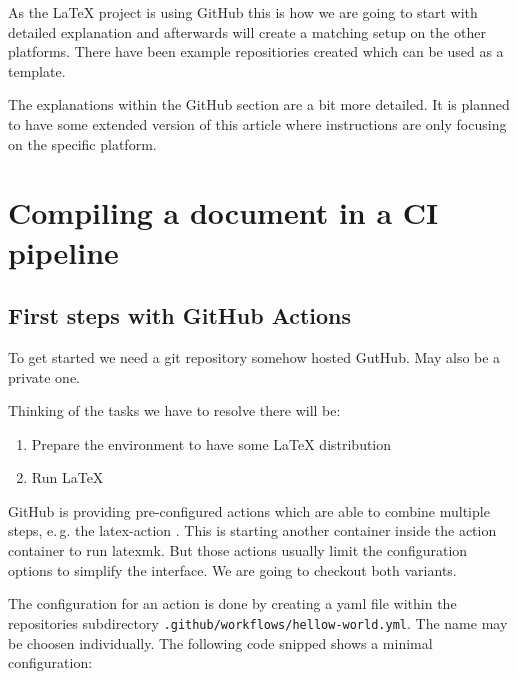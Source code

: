 \documentclass[final]{ltugboat}
\newcommand*{\file}[1]{\texttt{#1}}
\begin{document}
As the \LaTeX{} project is using GitHub this is how we are going to start with detailed explanation and afterwards will create a matching setup on the other platforms.
There have been example repositiories created which can be used as a template.

The explanations within the GitHub section are a bit more detailed.
It is planned to have some extended version of this article where instructions are only focusing on the specific platform.

\section{Compiling a document in a CI pipeline}

\subsection{First steps with GitHub Actions}

To get started we need a git repository somehow hosted GutHub.
May also be a private one.

Thinking of the tasks we have to resolve there will be:

\begin{enumerate}
\item Prepare the environment to have some \LaTeX{} distribution
\item Run \LaTeX{}
\end{enumerate}
%
\noindent GitHub is providing pre-configured actions which are able to combine multiple steps, e.\,g. the latex-action \cite{latex-action}.
This  is starting another container inside the action container to run latexmk.
But those actions usually limit the configuration options to simplify the interface.
We are going to checkout both variants.

The configuration for an action is done by creating a yaml file within the repositories subdirectory \file{.github/workflows/hellow-world.yml}.
The name may be choosen individually.
The following code snipped shows a minimal configuration:

\inputminted{yaml}{examples/hello-world.yml}
\end{document}
